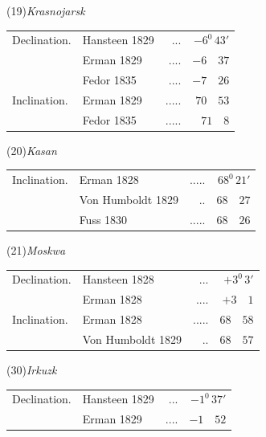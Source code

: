 \begin{center}
\begin{minipage}[t]{\linewidth}\centering
(19)\quad\textit{Krasnojarsk}\par\smallskip
\begin{tabular}{llrr}
Declination.&Hansteen 1829&.\quad.\quad.&$-6^0\,43'$\\
&Erman 1829&.\quad.\quad.\quad.&$-6\quad37$\\
&Fedor 1835&.\quad.\quad.\quad.&$-7\quad26$\\
Inclination.&Erman 1829&.\quad.\quad.\quad.\quad.&$70\quad53$\\
&Fedor 1835&.\quad.\quad.\quad.\quad.&$71\quad8$
\end{tabular}
\end{minipage}\par\medskip
\begin{minipage}[t]{\linewidth}\centering
(20)\quad\textit{Kasan}\par\smallskip
\begin{tabular}{llrr}
Inclination.&Erman 1828&.\quad.\quad.\quad.\quad.&$68^0\,21'$\\
&Von Humboldt 1829&.\quad.&$68\quad27$\\
&Fuss 1830&.\quad.\quad.\quad.\quad.&$68\quad26$
\end{tabular}
\end{minipage}\par\medskip
\begin{minipage}[t]{\linewidth}\centering
(21)\quad\textit{Moskwa}\par\smallskip
\begin{tabular}{llrr}
Declination.&Hansteen 1828&.\quad.\quad.&$+3^0\,3'$\\
&Erman 1828&.\quad.\quad.\quad.&$+3\quad1$\\
Inclination.&Erman 1828&.\quad.\quad.\quad.\quad.&$68\quad58$\\
&Von Humboldt 1829&.\quad.&$68\quad57$
\end{tabular}
\end{minipage}\par\medskip
\begin{minipage}[t]{\linewidth}\centering
(30)\quad\textit{Irkuzk}\par\smallskip
\begin{tabular}{llrr}
Declination.&Hansteen 1829&.\quad.\quad.&$-1^0\,37'$\\
&Erman 1829&.\quad.\quad.\quad.&$-1\quad52$\\

\end{tabular}
\end{minipage}
\end{center}
